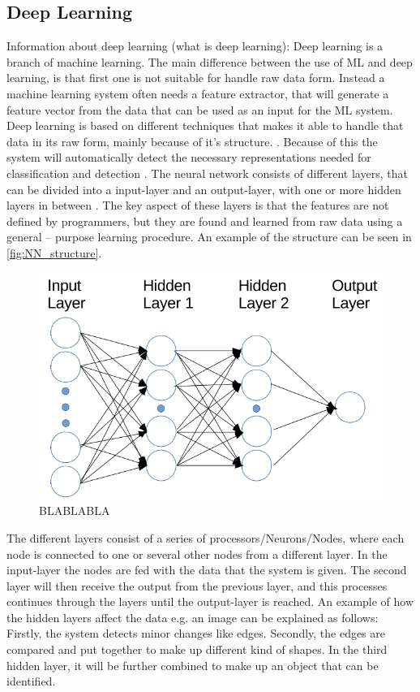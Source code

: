 \subsection{Deep Learning}

Information about deep learning (what is deep learning):
Deep learning is a branch of machine learning. The main difference between the use of ML and deep learning, is that first one is not suitable for handle raw data form. Instead a machine learning system often needs a feature extractor, that will generate a feature vector from the data that can be used as an input for the ML system. \citep{LeCun2015}
Deep learning is based on different techniques that makes it able to handle that data in its raw form, mainly because of it’s structure. \citep{LeCun2015, Schmidhuber2015}. Because of this the system will automatically detect the necessary representations needed for classification and detection \citep{LeCun2015}. The neural network consists of different layers, that can be divided into a input-layer and an output-layer, with one or more hidden layers in between \citep{LeCun2015, Schmidhuber2015}. The key aspect of these layers is that the features are not defined by programmers, but they are found and learned from raw data using a general – purpose learning procedure. \citep{LeCun2015} An example of the structure can be seen in \autoref{fig:NN_structure}.   


\begin{figure} [H]
\centering
\includegraphics[width=1\textwidth]{figures/NN_structure}
\caption{BLABLABLA}
\label{fig:NN_structure}  
\end{figure}


The different layers consist of a series of processors/Neurons/Nodes, where each node is connected to one or several other nodes from a different layer. In the input-layer the nodes are fed with the data that the system is given. The second layer will then receive the output from the previous layer, and this processes continues through the layers until the output-layer is reached. \citep{Schmidhuber2015} An example of how the hidden layers affect the data e.g. an image can be explained as follows:  
Firstly, the system detects minor changes like edges. Secondly, the edges are compared and put together to make up different kind of shapes. In the third hidden layer, it will be further combined to make up an object that can be identified. \citep{LeCun2015}

